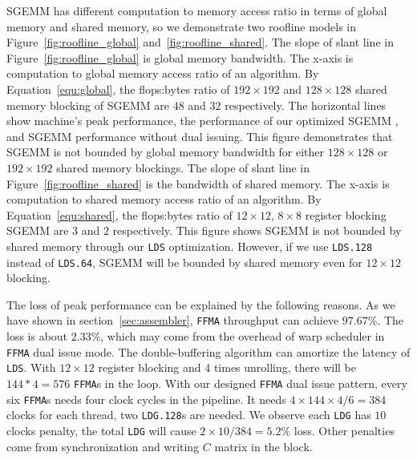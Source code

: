 SGEMM has different computation to memory access ratio in terms of global memory and shared memory, so we demonstrate
two roofline models in Figure~\ref{fig:roofline_global} and~\ref{fig:roofline_shared}. 
The slope of slant line in Figure~\ref{fig:roofline_global} is global memory bandwidth. The x-axis is computation to global
memory access ratio of an algorithm. 
By Equation~\ref{equ:global}, the flops:bytes ratio of $192\times192$ and $128\times128$ shared 
memory blocking of SGEMM are $48$ and $32$ respectively. The horizontal lines
show machine's peak performance, the performance of our optimized SGEMM
, and SGEMM performance without dual issuing.
This figure demonstrates that SGEMM is not bounded by global memory bandwidth
for either $128\times128$ or $192\times 192$ shared memory blockings.
The slope of slant line in Figure~\ref{fig:roofline_shared} is the bandwidth of shared memory. The x-axis is computation to
shared memory access ratio of an algorithm. 
By Equation~\ref{equ:shared}, the flops:bytes ratio of $12\times12$, $8\times8$ register blocking SGEMM are $3$ and $2$ respectively. 
This figure shows SGEMM is not bounded by shared memory through our {\tt LDS} optimization. 
However, if we use {\tt LDS.128} instead of {\tt LDS.64}, SGEMM will be bounded by shared memory even for $12\times 12$ blocking.

The loss of peak performance can be explained by the following reasons. As we have shown in 
section~\ref{sec:assembler}, {\tt FFMA} throughput can achieve $97.67\%$. 
The loss is about $2.33\%$, which may come 
from the overhead of warp scheduler in {\tt FFMA} dual issue mode. The double-buffering algorithm can amortize the latency 
of {\tt LDS}.
With $12\times12$ register blocking and $4$ times unrolling, there will be $144*4=576$ {\tt FFMA}s in the loop.
With our designed {\tt FFMA} dual issue pattern, every six {\tt FFMA}s needs four clock cycles in the pipeline.
It needs $4\times144\times4/6=384$ clocks for each thread, two {\tt LDG.128}s are needed.
We observe each {\tt LDG} has $10$ clocks penalty, the total {\tt LDG} will cause $2\times10/384 = 5.2\%$ loss. Other
penalties come from synchronization and writing $C$ matrix in the block.
